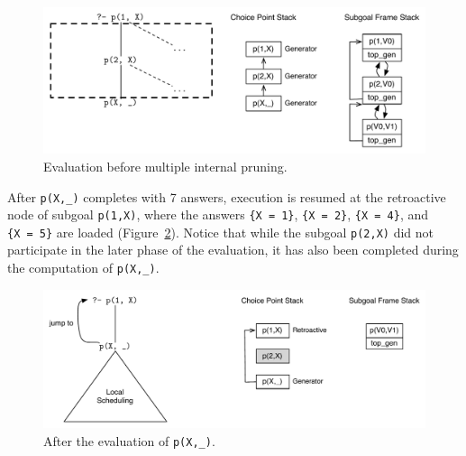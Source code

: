 \begin{figure}[ht]
  \centering
    \includegraphics[scale=0.6]{retro_multiple_internal1.pdf}
  \caption{Evaluation before multiple internal pruning.}
  \label{fig:retro_multiple_internal1}
\end{figure}

After \texttt{p(X,\_)} completes with 7 answers, 
execution is resumed at the retroactive node of
subgoal \texttt{p(1,X)}, where the answers
\texttt{\{X~=~1\}},
\texttt{\{X~=~2\}},
\texttt{\{X~=~4\}},
and \texttt{\{X~=~5\}}
are loaded
(Figure~\ref{fig:retro_multiple_internal2}).
Notice that while the subgoal \texttt{p(2,X)} did not participate in the later phase of the evaluation,
it has also been completed during the computation of \texttt{p(X,\_)}.



\begin{figure}[ht]
  \centering
    \includegraphics[scale=0.6]{retro_multiple_internal2.pdf}
  \caption{After the evaluation of \texttt{p(X,\_)}.}
  \label{fig:retro_multiple_internal2}
\end{figure}

